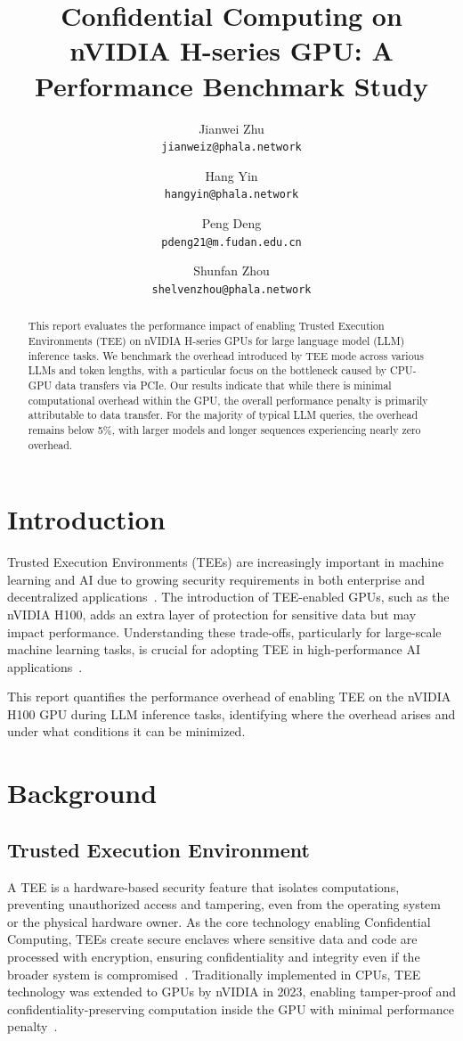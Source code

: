 \documentclass{article}
\title{Confidential Computing on nVIDIA H-series GPU: A Performance Benchmark Study}
\author{
  Jianwei Zhu \\
  \texttt{jianweiz@phala.network}
  \and
  Hang Yin \\
  \texttt{hangyin@phala.network}
  \and
  Peng Deng \\
  \texttt{pdeng21@m.fudan.edu.cn}
  \and
  Shunfan Zhou \\
  \texttt{shelvenzhou@phala.network}
}
\begin{document}
\maketitle

\begin{abstract}
    This report evaluates the performance impact of enabling Trusted Execution Environments (TEE) on nVIDIA H-series GPUs for large language model (LLM) inference tasks. We benchmark the overhead introduced by TEE mode across various LLMs and token lengths, with a particular focus on the bottleneck caused by CPU-GPU data transfers via PCIe. Our results indicate that while there is minimal computational overhead within the GPU, the overall performance penalty is primarily attributable to data transfer. For the majority of typical LLM queries, the overhead remains below 5\%, with larger models and longer sequences experiencing nearly zero overhead.
\end{abstract}

\section{Introduction}

Trusted Execution Environments (TEEs) are increasingly important in machine learning and AI due to growing security requirements in both enterprise and decentralized applications~\cite{sabt2015trusted, matetic2018delegatee, ayoade2018decentralized}. The introduction of TEE-enabled GPUs, such as the nVIDIA H100, adds an extra layer of protection for sensitive data but may impact performance. Understanding these trade-offs, particularly for large-scale machine learning tasks, is crucial for adopting TEE in high-performance AI applications~\cite{yudha2022lite, wang2024confidential}.

This report quantifies the performance overhead of enabling TEE on the nVIDIA H100 GPU during LLM inference tasks, identifying where the overhead arises and under what conditions it can be minimized.

\section{Background}

\subsection{Trusted Execution Environment}

A TEE is a hardware-based security feature that isolates computations, preventing unauthorized access and tampering, even from the operating system or the physical hardware owner. As the core technology enabling Confidential Computing, TEEs create secure enclaves where sensitive data and code are processed with encryption, ensuring confidentiality and integrity even if the broader system is compromised~\cite{sabt2015trusted}. Traditionally implemented in CPUs, TEE technology was extended to GPUs by nVIDIA in 2023, enabling tamper-proof and confidentiality-preserving computation inside the GPU with minimal performance penalty~\cite{dhanuskodi2023creating}.
\end{document}
